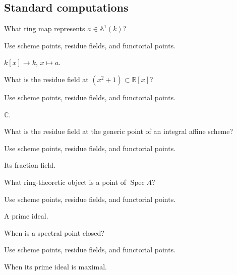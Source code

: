 \subsection*{Standard computations}

\begin{exercise}\label{exr:vi21-expand-01}
What ring map represents $a\in\mathbb A^1(k)$?
\end{exercise}
\begin{hint}
Use scheme points, residue fields, and functorial points.
\end{hint}
\begin{solution}
$k[x]\to k$, $x\mapsto a$.
\end{solution}

\begin{exercise}\label{exr:vi21-expand-02}
What is the residue field at $(x^2+1)\subset\mathbb R[x]$?
\end{exercise}
\begin{hint}
Use scheme points, residue fields, and functorial points.
\end{hint}
\begin{solution}
$\mathbb C$.
\end{solution}

\begin{exercise}\label{exr:vi21-expand-03}
What is the residue field at the generic point of an integral affine scheme?
\end{exercise}
\begin{hint}
Use scheme points, residue fields, and functorial points.
\end{hint}
\begin{solution}
Its fraction field.
\end{solution}

\begin{exercise}\label{exr:vi21-expand-04}
What ring-theoretic object is a point of $\operatorname{Spec}A$?
\end{exercise}
\begin{hint}
Use scheme points, residue fields, and functorial points.
\end{hint}
\begin{solution}
A prime ideal.
\end{solution}

\begin{exercise}\label{exr:vi21-expand-05}
When is a spectral point closed?
\end{exercise}
\begin{hint}
Use scheme points, residue fields, and functorial points.
\end{hint}
\begin{solution}
When its prime ideal is maximal.
\end{solution}

